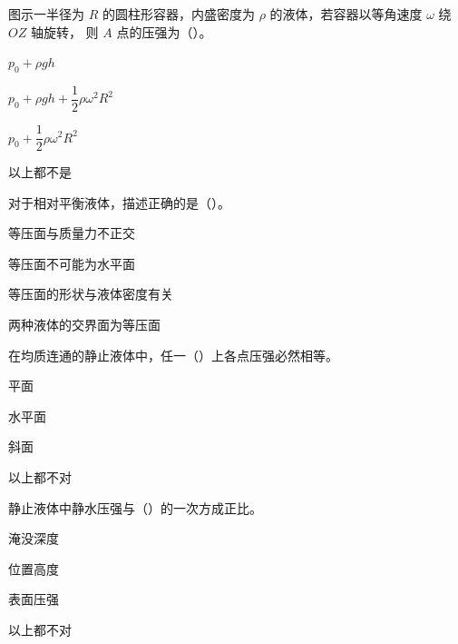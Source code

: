 \begin{ti}
\item[2-5] 图示一半径为 $R$ 的圆柱形容器，内盛密度为 $\rho$ 的液体，若容器以等角速度 $\omega$ 绕 $OZ$ 轴旋转，
则 $A$ 点的压强为（\quad）。
\begin{choices}
\item $p_0+\rho gh$
\item $p_0+\rho gh+\dfrac{1}{2}\rho\omega^2R^2$
\item $p_0+\dfrac{1}{2}\rho\omega^2R^2$
\item 以上都不是
\end{choices}

\item[2-6] 对于相对平衡液体，描述正确的是（\quad）。
\begin{choices}
\item 等压面与质量力不正交
\item 等压面不可能为水平面
\item 等压面的形状与液体密度有关
\item 两种液体的交界面为等压面
\end{choices}

\item[2-7] 在均质连通的静止液体中，任一（\quad）上各点压强必然相等。
\begin{choices}
\item 平面
\item 水平面
\item 斜面
\item 以上都不对
\end{choices}

\item[2-8] 静止液体中静水压强与（\quad）的一次方成正比。
\begin{choices}
\item 淹没深度
\item 位置高度
\item 表面压强
\item 以上都不对
\end{choices}


\end{ti}
